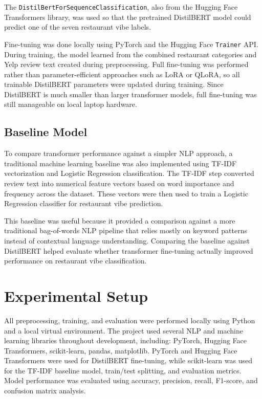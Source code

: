 \documentclass[11pt]{article}
\begin{document}
The \texttt{DistilBertForSequenceClassification}, also from the Hugging Face Transformers library, was used so that the pretrained DistilBERT model could predict one of the seven restaurant vibe labels.

\medbreak \noindent Fine-tuning was done locally using PyTorch and the Hugging Face \texttt{Trainer} API. During training, the model learned from the combined restaurant categories and Yelp review text 
created during preprocessing. Full fine-tuning was performed rather than parameter-efficient approaches such as LoRA or QLoRA, so all trainable DistilBERT parameters were updated during training. 
Since DistilBERT is much smaller than larger transformer models, full fine-tuning was still manageable on local laptop hardware.


\subsection{Baseline Model}

To compare transformer performance against a simpler NLP approach, a traditional machine learning baseline was also implemented using TF-IDF vectorization and Logistic Regression classification. 
The TF-IDF step converted review text into numerical feature vectors based on word importance and frequency across the dataset. These vectors were then used to train a Logistic Regression 
classifier for restaurant vibe prediction.

\medbreak \noindent This baseline was useful because it provided a comparison against a more traditional bag-of-words NLP pipeline that relies mostly on keyword patterns instead of contextual 
language understanding. Comparing the baseline against DistilBERT helped evaluate whether transformer fine-tuning actually improved performance on restaurant vibe classification.


\section{Experimental Setup}

All preprocessing, training, and evaluation were performed locally using Python and a local virtual environment. The project used several NLP and machine learning libraries throughout development, including:
PyTorch, Hugging Face Transformers, scikit-learn, pandas, matplotlib. PyTorch and Hugging Face Transformers were used for DistilBERT fine-tuning, while scikit-learn was used for the TF-IDF baseline model, 
train/test splitting, and evaluation metrics. Model performance was evaluated using accuracy, precision, recall, F1-score, and confusion matrix analysis. 
\end{document}

